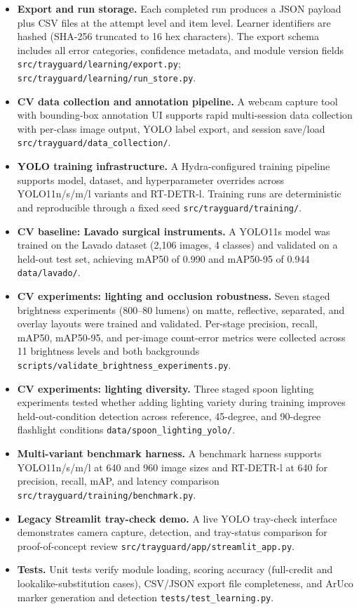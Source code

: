 \documentclass[10pt,a4paper]{article}
\begin{document}
\begin{itemize}
  \item \textbf{Export and run storage.} Each completed run produces a JSON payload plus CSV files at the attempt level and item level. Learner identifiers are hashed (SHA-256 truncated to 16 hex characters). The export schema includes all error categories, confidence metadata, and module version fields \texttt{src/trayguard/learning/export.py}; \texttt{src/trayguard/learning/run\_store.py}.
   \item \textbf{CV data collection and annotation pipeline.} A webcam capture tool with bounding-box annotation UI supports rapid multi-session data collection with per-class image output, YOLO label export, and session save/load \texttt{src/trayguard/data\_collection/}.
   \item \textbf{YOLO training infrastructure.} A Hydra-configured training pipeline supports model, dataset, and hyperparameter overrides across YOLO11n/s/m/l variants and RT-DETR-l. Training runs are deterministic and reproducible through a fixed seed \texttt{src/trayguard/training/}.
   \item \textbf{CV baseline: Lavado surgical instruments.} A YOLO11s model was trained on the Lavado dataset (2,106 images, 4 classes) and validated on a held-out test set, achieving mAP50 of 0.990 and mAP50-95 of 0.944 \texttt{data/lavado/}.
   \item \textbf{CV experiments: lighting and occlusion robustness.} Seven staged brightness experiments (800--80 lumens) on matte, reflective, separated, and overlay layouts were trained and validated. Per-stage precision, recall, mAP50, mAP50-95, and per-image count-error metrics were collected across 11 brightness levels and both backgrounds \texttt{scripts/validate\_brightness\_experiments.py}.
   \item \textbf{CV experiments: lighting diversity.} Three staged spoon lighting experiments tested whether adding lighting variety during training improves held-out-condition detection across reference, 45-degree, and 90-degree flashlight conditions \texttt{data/spoon\_lighting\_yolo/}.
   \item \textbf{Multi-variant benchmark harness.} A benchmark harness supports YOLO11n/s/m/l at 640 and 960 image sizes and RT-DETR-l at 640 for precision, recall, mAP, and latency comparison \texttt{src/trayguard/training/benchmark.py}.
   \item \textbf{Legacy Streamlit tray-check demo.} A live YOLO tray-check interface demonstrates camera capture, detection, and tray-status comparison for proof-of-concept review \texttt{src/trayguard/app/streamlit\_app.py}.
   \item \textbf{Tests.} Unit tests verify module loading, scoring accuracy (full-credit and lookalike-substitution cases), CSV/JSON export file completeness, and ArUco marker generation and detection \texttt{tests/test\_learning.py}.
\end{itemize}
\end{document}
